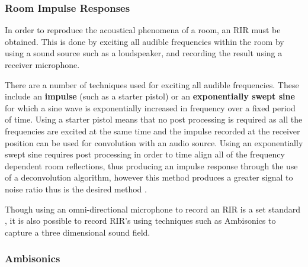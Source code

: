 \documentclass[../../main.tex]{subfiles}
\begin{document}

		\subsubsection{Room Impulse Responses}

			In order to reproduce the acoustical phenomena of a room, an \ac{RIR} must be obtained. This is done by exciting all audible frequencies within the room by using a sound source such as a loudspeaker, and recording the result using a receiver microphone.

			There are a number of techniques used for exciting all audible frequencies. These include an \textbf{impulse} (such as a starter pistol) or an \textbf{exponentially swept sine} for which a sine wave is exponentially increased in frequency over a fixed period of time. Using a starter pistol means that no post processing is required as all the frequencies are excited at the same time and the impulse recorded at the receiver position can be used for convolution with an audio source. Using an exponentially swept sine requires post processing in order to time align all of the frequency dependent room reflections, thus producing an impulse response through the use of a deconvolution algorithm, however this method produces a greater signal to noise ratio thus is the desired method \cite{Stan2002}. 

			Though using an omni-directional microphone to record an \ac{RIR} is a set standard \cite{ISO}, it is also possible to record \ac{RIR}'s using techniques such as Ambisonics to capture a three dimensional sound field.

		

		\subsubsection{Ambisonics}
\end{document}
